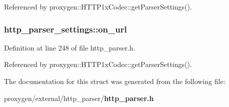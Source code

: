 Referenced by proxygen\+::\+H\+T\+T\+P1x\+Codec\+::get\+Parser\+Settings().

\subsubsection[{on\+\_\+url}]{ http\+\_\+parser\+\_\+settings\+::on\+\_\+url}\label{structhttp__parser__settings_a9c24dfa900b49bf3439bbfba572b42fb}


Definition at line 248 of file http\+\_\+parser.\+h.



Referenced by proxygen\+::\+H\+T\+T\+P1x\+Codec\+::get\+Parser\+Settings().



The documentation for this struct was generated from the following file\+:\begin{DoxyCompactItemize}
\item 
proxygen/external/http\+\_\+parser/{\bf http\+\_\+parser.\+h}\end{DoxyCompactItemize}
